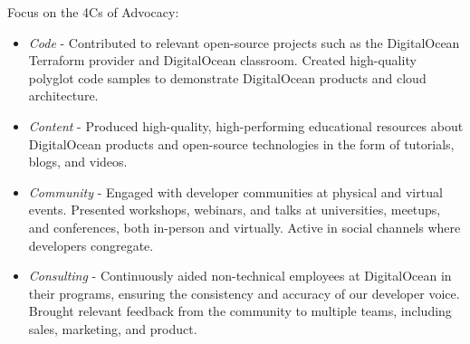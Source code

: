 \documentclass[10pt]{article} %
\begin{document}
\begin{minipage}[t]{0.5\textwidth}
{    Focus on the 4Cs of Advocacy:

    \begin{itemize}
        \item \textit{Code} - Contributed to relevant open-source projects such as the DigitalOcean Terraform provider and DigitalOcean classroom. Created high-quality polyglot code samples to demonstrate DigitalOcean products and cloud architecture.
    
        \item \textit{Content} - Produced high-quality, high-performing educational resources about DigitalOcean products and open-source technologies in the form of tutorials, blogs, and videos.
    
        \item \textit{Community} - Engaged with developer communities at physical and virtual events. Presented workshops, webinars, and talks at universities, meetups, and conferences, both in-person and virtually. Active in social channels where developers congregate.
        
        \item \textit{Consulting} - Continuously aided non-technical employees at DigitalOcean in their programs, ensuring the consistency and accuracy of our developer voice. Brought relevant feedback from the community to multiple teams, including sales, marketing, and product.
    \end{itemize}
}



\end{minipage} %
\hfill
\end{document}
